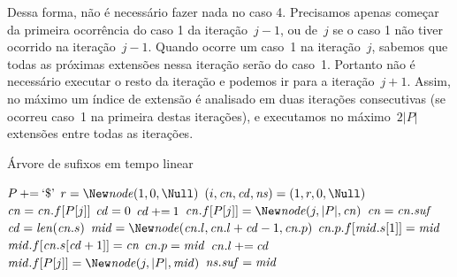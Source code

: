 Dessa forma, não é necessário fazer nada no caso 4. Precisamos apenas começar da primeira ocorrência do caso 1 da iteração~$j-1$, ou de~$j$ se o caso 1 não tiver ocorrido na iteração~$j-1$. Quando ocorre um caso~1 na iteração~$j$, sabemos que todas as próximas extensões nessa iteração serão do caso~1. Portanto não é necessário executar o resto da iteração e podemos ir para a iteração~$j + 1$. Assim, no máximo um índice de extensão é analisado em duas iterações consecutivas (se ocorreu caso~1 na primeira destas iterações), e executamos no máximo~$2|P|$ extensões entre todas as iterações.

\begin{algorithm}
\caption{Árvore de sufixos em tempo linear}
\label{lst:sufftreelin}
\begin{algorithmic}[1]
    \State $P \mathbin{{\tiny +}{=}} \text{`\$'}$
    \State $r = \New \node(1, 0, \Null)$ 
    \State $(i, \cn, \cd, \ns) = (1, r, 0, \Null)$
     \label{lst:stl:mainfor} 
         \label{lst:stl:mainwhile} 
             \label{lst:stl:caso1s} 
                \State $\mathit{cn} = \mathit{cn}.f[P[j]]$ \label{lst:stl:cn1}
                \State $\mathit{cd} = 0$ \label{lst:stl:caso1.2}
            \EndIf
             \label{lst:stl:caso1.1}
                \State $\mathit{cd} \mathbin{{\tiny +}{=}} 1$ \label{lst:stl:incrcd}
                \State \Break \label{lst:stl:caso1e}
            \EndIf
            \If{$\cd = \len{\cn}$} \label{lst:stl:caso2s} 
                \State $\cn.f[P[j]] = \New \node(j, |P|, \cn)$
                    \State $\mathit{cn} = \mathit{cn}.\mathit{suf}$ \label{lst:stl:cn2}
                    \State $\cd = \len{\cn}$ \label{lst:stl:caso2e}
                \EndIf
            \Else \label{lst:stl:caso3s} 
                \State $\mmid = \New \node(\cn.l, \cn.l + \cd - 1, \cn.p)$ \label{lst:stl:mids}
                \State $\mathit{cn}.p.f[\mathit{mid}.s[1]] = \mathit{mid}$ 
                \State $\mathit{mid}.f[\mathit{cn}.s[\mathit{cd} + 1]] = \mathit{cn}$ \label{lst:stl:midcns}
                \State $\mathit{cn}.p = \mathit{mid}$
                \State $\mathit{cn}.l \mathbin{{\tiny +}{=}} \mathit{cd}$  \label{lst:stl:midcne}
                \State $\mmid.f[P[j]] = \New \node(j, |P|, \mmid)$ \label{lst:stl:leaf} \label{lst:stl:mide}
                \If{$\ns \neq \Null$} \label{lst:stl:sufs}
                    \State $\mathit{ns}.\mathit{suf} = \mathit{mid}$ \label{lst:stl:sufe}

\end{algorithmic}
\end{algorithm}
